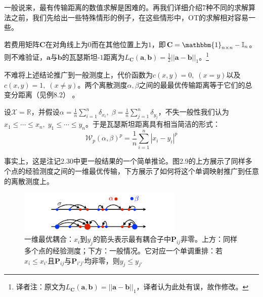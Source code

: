 \documentclass[cn,10pt,math=newtx,citestyle=gb7714-2015,bibstyle=gb7714-2015]{elegantbook}
\begin{document}
一般说来，最有传输距离的数值求解是困难的。再我们详细介绍7种不同的求解算法之前，我们先给出一些特殊情形的例子，在这些情形中，OT的求解相对容易一些。

\begin{postulate}[01费用矩阵与一范数]
若费用矩阵$\mathbf{C}$在对角线上为$0$而在其他位置上为$1$，即$\mathbf{C}=\mathbbm{1}_{n\times n}-\mathbb{I}_n$。则不难验证，$\mathbf{a}$与$\mathbf{b}$的瓦瑟斯坦-$1$距离为$L_\mathbf{C}(\mathbf{a,b})=\frac{1}{2}||\mathbf{a}-\mathbf{b}||_1$。\footnote{译者注：原文为$L_\mathbf{C}(\mathbf{a,b})=||\mathbf{a}-\mathbf{b}||_1$，译者认为此处有误，故作修改。}
\end{postulate}

\begin{postulate}[克罗内克费用函数与总变分数]
不难将上述结论推广到一般测度上，代价函数为$c(x,y)=0,\;(x=y)$以及$c(x,y)=1,\;(x\neq y)$。两个离散测度$\alpha,\beta$之间的最最优传输距离等于它们的总变分距离（见例8.2）  。
\end{postulate}

\begin{postulate}
设$\mathcal{X}=\mathbb{R}$，并假设$\alpha=\frac{1}{n}\sum_{i=1}^n\delta_{x_i},\;\beta=\frac{1}{n}\sum_{j=1}^n\delta_{y_j}$，不失一般性我们认为$x_1\leq \cdots \leq x_n,\;y_1\leq \cdots \leq y_n$。于是瓦瑟斯坦距离具有相当简洁的形式：
\begin{equation}
    \label{2.33}
    \mathcal{W}_p(\alpha,\beta)^p=\frac{1}{n}\sum_{i=1}^n |x_i-y_i|^p
\end{equation}

事实上，这是注记2.30中更一般结果的一个简单推论。图2.9的上方展示了同样多个点的经验测度之间的一维最优传输，下方展示了如何将这个单调映射推广到任意的离散测度上。
\end{postulate}

\begin{figure}[H]
    \centering
    \includegraphics[width=0.7\textwidth]{figure/fig2.9.png}
    \caption{一维最优耦合：$x_i$到$y_j$的箭头表示最有耦合子中$\mathbf{P}_{ij}$非零。上方：同样多个点的经验测度；下方：一般情况。它对应一个单调重排：若$x_i\leq x_{i'}$且$\mathbf{P}_{ij}$与$\mathbf{P}_{i'j'}$均非零，则$y_j\leq y_{j'}$}
    \label{图2.9}
\end{figure}
\end{document}
